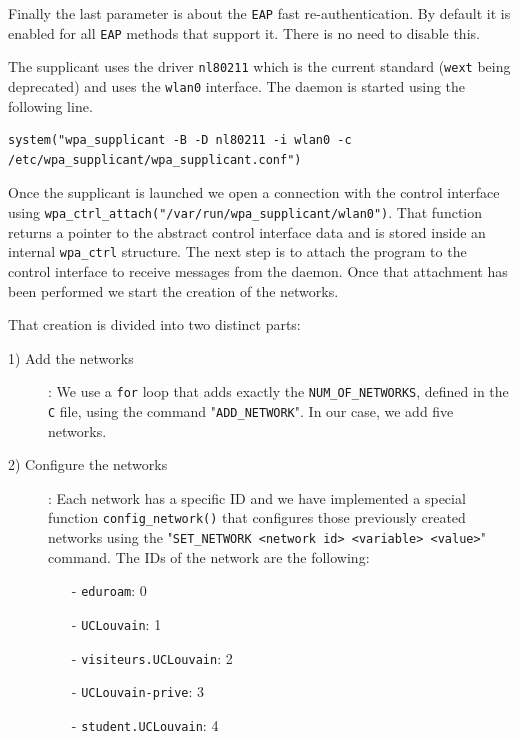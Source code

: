 Finally the last parameter is about the \texttt{EAP} fast re-authentication. By default it is enabled for all \texttt{EAP} methods that support it. There is no need to disable this.


The supplicant uses the driver \texttt{nl80211} which is the current standard (\texttt{wext} being deprecated) and uses the \texttt{wlan0} interface. The daemon is started using the following line.\\

\begin{lstlisting}[frame=single,breaklines=true,caption={Starting the \texttt{wpa\_supplicant} daemon}]
system("wpa_supplicant -B -D nl80211 -i wlan0 -c /etc/wpa_supplicant/wpa_supplicant.conf")
\end{lstlisting}

Once the supplicant is launched we open a connection with the control interface using \texttt{wpa\_ctrl\_attach("/var/run/wpa\_supplicant/wlan0")}. That function returns a pointer to the abstract control interface data and is stored inside an internal \texttt{wpa\_ctrl} structure. The next step is to attach the program to the control interface to receive messages from the daemon. Once that attachment has been performed we start the creation of the networks.

That creation is divided into two distinct parts:
\begin{description}
	\item [1) Add the networks]: We use a \texttt{for} loop that adds exactly the \texttt{NUM\_OF\_NETWORKS}, defined in the \texttt{C} file, using the command "\texttt{ADD\_NETWORK}". In our case, we add five networks.
	\item [2) Configure the networks]: Each network has a specific ID and we have implemented a special function \texttt{config\_network()} that configures those previously created networks using the "\texttt{SET\_NETWORK <network id> <variable> <value>}" command. The IDs of the network are the following:
		\begin{itemize}
			\item [-] \texttt{eduroam}: 0
			\item [-] \texttt{UCLouvain}: 1
			\item [-] \texttt{visiteurs.UCLouvain}: 2
			\item [-] \texttt{UCLouvain-prive}: 3
			\item [-] \texttt{student.UCLouvain}: 4
		\end{itemize}
\end{description}

